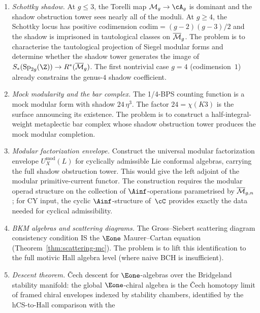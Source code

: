 \begin{enumerate}[label=\textup{(\roman*)}]
 (Remark~\ref{rem:bkm-decomposition-adversarial}). The
 Hilbert--Chow exceptional divisor accounts for
 $\chi(\mathrm{Hilb}^2) - \chi(\mathrm{Sym}^2) = 24 = \chi(K3)$,
 and the DMVV symmetric product formula implements the
 passage from single-copy bar complex to second-quantized
 partition function.
\item \emph{Schottky shadow.}
 At $g \leq 3$, the Torelli map $\cM_g \to \cA_g$ is dominant
 and the shadow obstruction tower sees nearly all of the
 moduli. At $g \geq 4$, the Schottky locus has positive
 codimension $\mathrm{codim} = (g-2)(g-3)/2$ and the shadow
 is imprisoned in tautological classes on
 $\overline{\mathcal{M}}_g$. The problem is to characterise the
 tautological projection of Siegel modular forms and
 determine whether the shadow tower generates the image of
 $S_*(\Sp_{2g}(\Z)) \to R^*(\overline{\cM}_g)$. The first
 nontrivial case $g = 4$ (codimension~$1$) already constrains
 the genus-$4$ shadow coefficient.
\item \emph{Mock modularity and the bar complex.}
 The 1/4-BPS counting function is a mock modular form with
 shadow $24\,\eta^3$. The factor $24 = \chi(K3)$ is the
 surface announcing its existence. The problem is to construct
 a half-integral-weight metaplectic bar complex whose shadow
 obstruction tower produces the mock modular completion.
\item \emph{Modular factorization envelope.}
 Construct the universal modular factorization envelope
 $U_X^{\mathrm{mod}}(L)$ for cyclically admissible Lie
 conformal algebras, carrying the full shadow obstruction
 tower. This would give the left adjoint of the modular
 primitive-current functor. The construction requires the
 modular operad structure on the collection of
 $\Ainf$-operations parametrised by $\overline{\mathcal{M}}_{g,n}$;
 for CY input, the cyclic $\Ainf$-structure of~$\cC$ provides
 exactly the data needed for cyclical admissibility.
\item \emph{BKM algebras and scattering diagrams.}
 The Gross--Siebert scattering diagram consistency condition
 IS the $\Eone$ Maurer--Cartan equation
 (Theorem~\ref{thm:scattering-mc}). The problem is to lift this
 identification to the full motivic Hall algebra level
 (where naive BCH is insufficient).
 \item \emph{Descent theorem.}
 \v{C}ech descent for $\Eone$-algebras over the Bridgeland
 stability manifold: the global $\Eone$-chiral algebra is
 the \v Cech homotopy limit of framed chiral envelopes indexed by
 stability chambers, identified by the hCS-to-Hall comparison with the

\end{enumerate}
